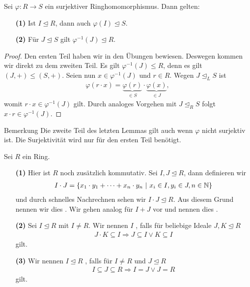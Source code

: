 \begin{lemma}\label{skript:8.12}
	Sei $ \varphi : R \to S $ ein surjektiver Ringhomomorphismus.
	Dann gelten:
	\begin{enumerate}
		\item[\textbf{(1)}]
		Ist $ I \unlhd R $, dann auch $ \varphi(I) \unlhd S $.
		\item[\textbf{(2)}]
		Für $ J \unlhd S $ gilt $ \varphi^{-1}(J) \unlhd R $. 
	\end{enumerate}
\end{lemma}

\begin{proof}
	Den ersten Teil haben wir in den Übungen bewiesen.
	Deswegen kommen wir direkt zu dem zweiten Teil.
	Es gilt $ \varphi^{-1}(J) \leq R $, denn es gilt $(J,+) \leq (S,+)  $.
	Seien nun $ x \in \varphi^{-1}(J) $ und $ r \in R $.
	Wegen $ J \unlhd_L S $ ist
	\begin{align*}
	\varphi(r \cdot x) = \underbrace{\varphi(r) }_{\in S} \cdot \underbrace{\varphi(x)}_{\in J},
	\end{align*}
	womit $ r \cdot x \in \varphi^{-1}(J) $ gilt.
	Durch analoges Vorgehen mit $ J \unlhd_R S $ folgt $ x \cdot r \in \varphi^{-1}(J) $.
\end{proof}

\begin{generic_no_num}{Bemerkung}
	Die zweite Teil des letzten Lemmas gilt auch wenn $ \varphi $ nicht surjektiv ist.
	Die Surjektivität wird nur für den ersten Teil benötigt.
\end{generic_no_num}

\begin{df} \label{skript:8.13}
	Sei $ R $ ein Ring.
	\begin{enumerate}
		\item[\textbf{(1)}]
		Hier ist $ R $ noch zusätzlich kommutativ.
		Sei $ I,J \unlhd R $, dann definieren wir 
		\begin{align*}
		I\cdot J = 
		\lbrace x_1 \cdot y_1 + \dots + x_n \cdot y_n\ | \ x_i \in I, y_i \in J, n \in \mathbb{N} \rbrace 
		\end{align*}
		und durch schnelles Nachrechnen sehen wir $ I \cdot J \unlhd R $.
		Aus diesem Grund nennen wir dies .
		Wir gehen analog für $ I + J $ vor und nennen dies .
		
		\item[\textbf{(2)}]
		Sei $ I \unlhd R $ mit $ I \neq R $.
		Wir nennen $ I $ , falls für beliebige Ideale
		$ J,K \unlhd R $ 
		\begin{align*}
		J \cdot K \subseteq I \Rightarrow J \subseteq I \vee K \subseteq I 
		\end{align*}
		gilt.
		
		\item[\textbf{(3)}]
		Wir nennen $ I \unlhd R $ ,
		falls für $I \neq R$ und $ J \unlhd R $
		\begin{align*}
		I \subseteq J \subseteq R
		\Rightarrow
		I = J \vee J = R
		\end{align*}
		gilt.
	\end{enumerate}
\end{df}

